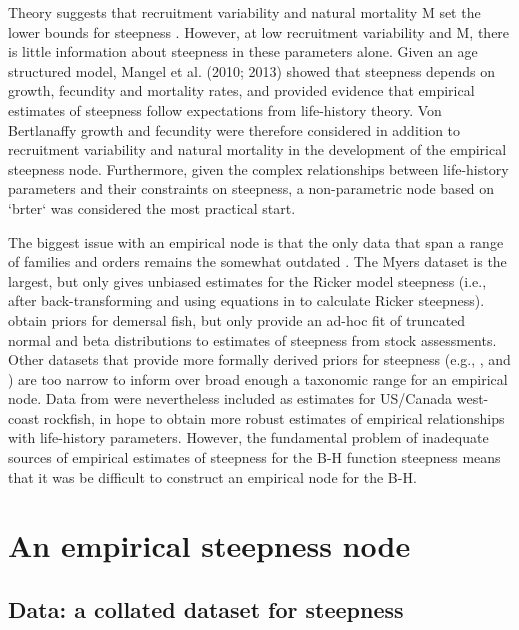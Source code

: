 \documentclass{dragonfly-report}\usepackage[]{graphicx}\usepackage[]{color}
\begin{document}
Theory suggests that recruitment variability and natural mortality M set the lower bounds for steepness \citep{he_2006_prior}. However, at low recruitment variability and M, there is little information about steepness in these parameters alone. Given an age structured model, Mangel et al. (2010; 2013) showed that steepness depends on growth, fecundity and mortality rates, and \citet{rose2001compensatory} provided evidence that empirical estimates of steepness follow expectations from life-history theory. Von Bertlanaffy growth and fecundity were therefore considered in addition to recruitment variability and natural mortality in the development of the empirical steepness node. Furthermore, given the complex relationships between life-history parameters and their constraints on steepness, a non-parametric node based on `brter` was considered the most practical start.

The biggest issue with an empirical node is that the only data that span a range of families and orders remains the somewhat outdated \citet{myers_1999_maximum}. The Myers dataset is the largest, but only gives unbiased estimates for the Ricker model steepness (i.e., after back-transforming and using equations in \citet{michielsens_2004_bayesian} to calculate Ricker steepness). \citet{shertzer2012spawner} obtain priors for demersal fish, but only provide an ad-hoc fit of truncated normal and beta distributions to estimates of steepness from stock assessments. Other datasets that provide more formally derived priors for steepness (e.g., \citet{michielsens_2004_bayesian}, \citet{dorn2002advice} and \citet{forrest2010hierarchical}) are too narrow to inform over broad enough a taxonomic range for an empirical node. Data from \citet{forrest2010hierarchical} were nevertheless included as estimates for US/Canada west-coast rockfish, in hope to obtain more robust estimates of empirical relationships with life-history parameters. However, the fundamental problem of inadequate sources of empirical estimates of steepness for the B-H function steepness means that it was be difficult to construct an empirical node for the B-H.

\section{An empirical steepness node}

\subsection{Data: a collated dataset for steepness}
\end{document}
